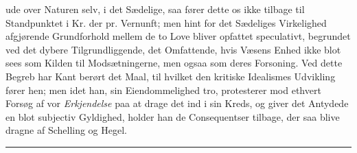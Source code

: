 \documentclass[12pt,a4paper]{book}
\newcommand{\divrule}{\begin{center}\rule{2cm}{0.4pt}\end{center}}
\begin{document}
ude over Naturen selv, i det Sædelige, saa fører dette os ikke
tilbage til Standpunktet i Kr. der pr. Vernunft; men hint for
det Sædeliges Virkelighed afgjørende Grundforhold mellem de
to Love bliver opfattet speculativt, begrundet ved det dybere
Tilgrundliggende, det Omfattende, hvis Væsens Enhed ikke
blot sees som Kilden til Modsætningerne, men ogsaa som
deres Forsoning. Ved dette Begreb har Kant berørt det Maal,
til hvilket den kritiske Idealismes Udvikling fører hen; men
idet han, sin Eiendommelighed tro, protesterer mod ethvert
Forsøg af vor \emph{Erkjendelse} paa at drage det ind i sin Kreds,
og giver det Antydede en blot subjectiv Gyldighed, holder han
de Consequentser tilbage, der saa blive dragne af Schelling og
Hegel.

\divrule
\end{document}
